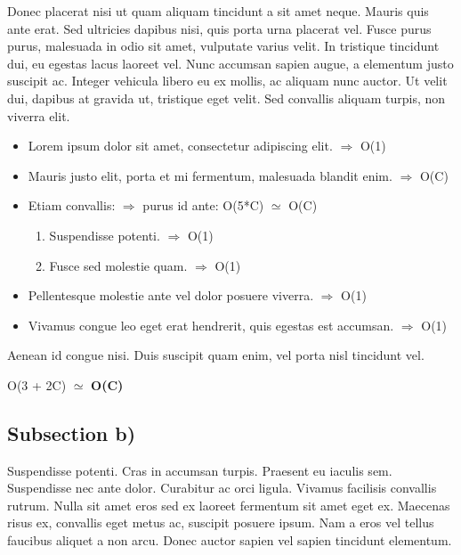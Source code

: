 \documentclass{article} %
\begin{document}
{\color{blue}
	Donec placerat nisi ut quam aliquam tincidunt a sit amet neque. Mauris quis ante erat. Sed ultricies dapibus nisi, quis porta urna placerat vel. Fusce purus purus, malesuada in odio sit amet, vulputate varius velit. In tristique tincidunt dui, eu egestas lacus laoreet vel. Nunc accumsan sapien augue, a elementum justo suscipit ac. Integer vehicula libero eu ex mollis, ac aliquam nunc auctor. Ut velit dui, dapibus at gravida ut, tristique eget velit. Sed convallis aliquam turpis, non viverra elit. 

	\begin{itemize}
		\item Lorem ipsum dolor sit amet, consectetur adipiscing elit. $\Longrightarrow$ O(1)
		\item Mauris justo elit, porta et mi fermentum, malesuada blandit enim. $\Longrightarrow$ O(C)
		\item Etiam convallis:  $\Longrightarrow$ purus id ante: O(5*C) $\simeq$ O(C)
		\begin{enumerate}
			\item Suspendisse potenti. $\Longrightarrow$ O(1)
			\item Fusce sed molestie quam. $\Longrightarrow$ O(1)
		\end{enumerate}
		\item Pellentesque molestie ante vel dolor posuere viverra.  $\Longrightarrow$ O(1)
		\item Vivamus congue leo eget erat hendrerit, quis egestas est accumsan. $\Longrightarrow$ O(1)
	\end{itemize}

	Aenean id congue nisi. Duis suscipit quam enim, vel porta nisl tincidunt vel.
	\begin{center}
		O(3 + 2C) $\simeq$ \textbf{O(C)}
	\end{center}
}

\subsection{Subsection b)}
Suspendisse potenti. Cras in accumsan turpis. Praesent eu iaculis sem. Suspendisse nec ante dolor. Curabitur ac orci ligula. Vivamus facilisis convallis rutrum. Nulla sit amet eros sed ex laoreet fermentum sit amet eget ex. Maecenas risus ex, convallis eget metus ac, suscipit posuere ipsum. Nam a eros vel tellus faucibus aliquet a non arcu. Donec auctor sapien vel sapien tincidunt elementum.
\\
\end{document}
